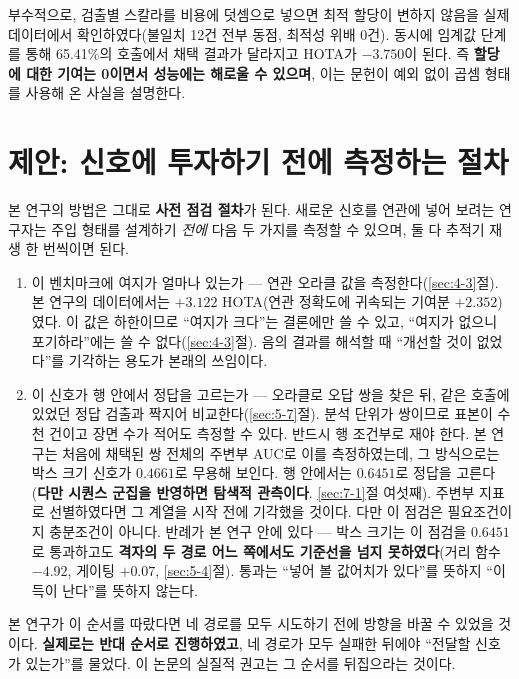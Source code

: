 \documentclass[12pt,a4paper,oneside]{report}
\begin{document}
부수적으로, 검출별 스칼라를 비용에 덧셈으로 넣으면 최적 할당이 변하지 않음을 실제 데이터에서 확인하였다(불일치 12건 전부 동점, 최적성 위배 0건). 동시에 임계값 단계를 통해 65.41\%의 호출에서 채택 결과가 달라지고 HOTA가 $-3.750$이 된다. 즉 \textbf{할당에 대한 기여는 0이면서 성능에는 해로울 수 있으며}, 이는 문헌이 예외 없이 곱셈 형태를 사용해 온 사실을 설명한다.

\section{제안: 신호에 투자하기 전에 측정하는 절차}\label{sec:7-2}

본 연구의 방법은 그대로 \textbf{사전 점검 절차}가 된다. 새로운 신호를 연관에 넣어 보려는 연구자는 주입 형태를 설계하기 \textit{전에} 다음 두 가지를 측정할 수 있으며, 둘 다 추적기 재생 한 번씩이면 된다.

\begin{enumerate}[leftmargin=2em]
\item 이 벤치마크에 여지가 얼마나 있는가 --- 연관 오라클 값을 측정한다(\ref{sec:4-3}절). 본 연구의 데이터에서는 $+3.122$ HOTA(연관 정확도에 귀속되는 기여분 $+2.352$)였다. 이 값은 하한이므로 ``여지가 크다''는 결론에만 쓸 수 있고, ``여지가 없으니 포기하라''에는 쓸 수 없다(\ref{sec:4-3}절). 음의 결과를 해석할 때 ``개선할 것이 없었다''를 기각하는 용도가 본래의 쓰임이다.
\item 이 신호가 행 안에서 정답을 고르는가 --- 오라클로 오답 쌍을 찾은 뒤, 같은 호출에 있었던 정답 검출과 짝지어 비교한다(\ref{sec:5-7}절). 분석 단위가 쌍이므로 표본이 수천 건이고 장면 수가 적어도 측정할 수 있다.
반드시 행 조건부로 재야 한다. 본 연구는 처음에 채택된 쌍 전체의 주변부 AUC로 이를 측정하였는데, 그 방식으로는 박스 크기 신호가 $0.4661$로 무용해 보인다. 행 안에서는 $0.6451$로 정답을 고른다(\textbf{다만 시퀀스 군집을 반영하면 탐색적 관측이다}. \ref{sec:7-1}절 여섯째). 주변부 지표로 선별하였다면 그 계열을 시작 전에 기각했을 것이다.
다만 이 점검은 필요조건이지 충분조건이 아니다. 반례가 본 연구 안에 있다 --- 박스 크기는 이 점검을 $0.6451$로 통과하고도 \textbf{격자의 두 경로 어느 쪽에서도 기준선을 넘지 못하였다}(거리 함수 $-4.92$, 게이팅 $+0.07$, \ref{sec:5-4}절). 통과는 ``넣어 볼 값어치가 있다''를 뜻하지 ``이득이 난다''를 뜻하지 않는다.
\end{enumerate}

본 연구가 이 순서를 따랐다면 네 경로를 모두 시도하기 전에 방향을 바꿀 수 있었을 것이다. \textbf{실제로는 반대 순서로 진행하였고}, 네 경로가 모두 실패한 뒤에야 ``전달할 신호가 있는가''를 물었다. 이 논문의 실질적 권고는 그 순서를 뒤집으라는 것이다.
\end{document}
